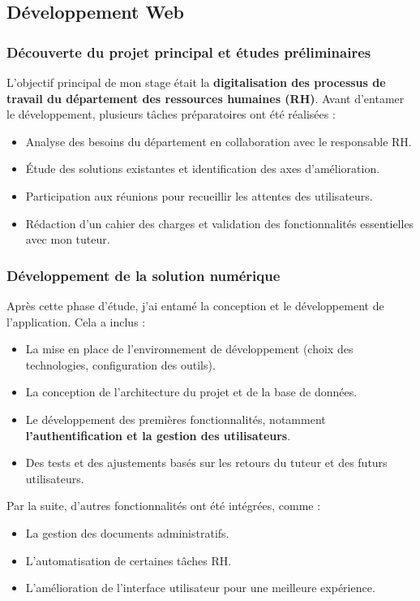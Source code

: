 \subsection{Développement Web}
\subsubsection{Découverte du projet principal et études préliminaires}
L'objectif principal de mon stage était la \textbf{digitalisation des processus de travail du département des ressources humaines (RH)}. Avant d'entamer le développement, plusieurs tâches préparatoires ont été réalisées :




\begin{itemize}
    \item Analyse des besoins du département en collaboration avec le responsable RH.
    \item Étude des solutions existantes et identification des axes d'amélioration.
    \item Participation aux réunions pour recueillir les attentes des utilisateurs.
    \item Rédaction d'un cahier des charges et validation des fonctionnalités essentielles avec mon tuteur.
\end{itemize}

\subsubsection{Développement de la solution numérique}
Après cette phase d'étude, j'ai entamé la conception et le développement de l'application. Cela a inclus :
\begin{itemize}
    \item La mise en place de l'environnement de développement (choix des technologies, configuration des outils).
    \item La conception de l'architecture du projet et de la base de données.
    \item Le développement des premières fonctionnalités, notamment \textbf{ l'authentification et la gestion des utilisateurs}.
    \item Des tests et des ajustements basés sur les retours du tuteur et des futurs utilisateurs.

\end{itemize}
Par la suite, d'autres fonctionnalités ont été intégrées, comme :

\begin{itemize}
    \item La gestion des documents administratifs.
    \item L'automatisation de certaines tâches RH.
    \item L'amélioration de l'interface utilisateur pour une meilleure expérience.
\end{itemize}
